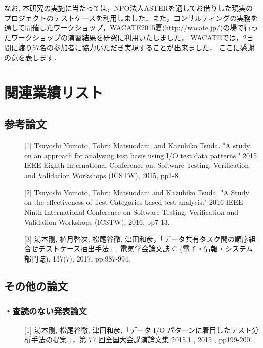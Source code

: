 \documentclass[a4paper,12pt]{jreport}
\begin{document}
なお, 本研究の実施に当たっては，NPO法人ASTERを通してお借りした現実のプロジェクトのテストケースを利用しました．また，コンサルティングの実務を通して開催したワークショップ，WACATE2015夏(http://wacate.jp/)の場で行ったワークショップの演習結果を研究に利用いたしました，
WACATEでは，2日間に渡り57名の参加者に協力いただき実現することが出来ました．
ここに感謝の意を表します．



  
  

\chapter*{関連業績リスト}
\section*{参考論文}
\begin{description}
  \item[] [1] Tsuyoshi Yumoto, Tohru Matsuodani, and Kazuhiko Tsuda. "A study on an approach for analysing test basis using I/O test data patterns." 2015 IEEE Eighth International Conference on. Software Testing, Verification and Validation Workshops (ICSTW), 2015, pp1-8.
  \item[] [2] Tsuyoshi Yumoto, Tohru Matsuodani and Kazuhiko Tsuda. "A Study on the effectiveness of Test-Categories based test analysis." 2016 IEEE Ninth International Conference on Software Testing, Verification and Validation Workshops (ICSTW), 2016, pp7-13.
  \item[] [3] 湯本剛, 植月啓次, 松尾谷徹, 津田和彦，「データ共有タスク間の順序組合せテストケース抽出手法」, 電気学会論文誌 C (電子・情報・システム部門誌), 137(7), 2017, pp.987-994.
\end{description}

\section*{その他の論文}
\subsection*{・査読のない発表論文}
\begin{description}
  \item[] [1] 湯本剛, 松尾谷徹, 津田和彦,「データ I/O パターンに着目したテスト分析手法の提案.」，第 77 回全国大会講演論文集 2015.1 , 2015 , pp199-200.
\end{description}
\end{document}

